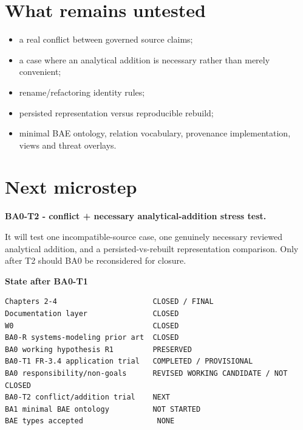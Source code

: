 \documentclass[10pt,a4paper]{article}
\newenvironment{resultbox}[1]{\def\FrameCommand{\fcolorbox{ddtagreen}{ddtagray}}\MakeFramed{\advance\hsize-2\width\FrameRestore}\noindent\textbf{#1}\par\smallskip}{\endMakeFramed}
\begin{document}
\section{What remains untested}
\begin{itemize}
\item a real conflict between governed source claims;
\item a case where an analytical addition is necessary rather than merely convenient;
\item rename/refactoring identity rules;
\item persisted representation versus reproducible rebuild;
\item minimal BAE ontology, relation vocabulary, provenance implementation, views and threat overlays.
\end{itemize}

\section{Next microstep}
\textbf{BA0-T2 - conflict + necessary analytical-addition stress test.}

It will test one incompatible-source case, one genuinely necessary reviewed analytical addition, and a persisted-vs-rebuilt representation comparison. Only after T2 should BA0 be reconsidered for closure.

\enlargethispage{2\baselineskip}
\begin{resultbox}{State after BA0-T1}
\begin{lstlisting}
Chapters 2-4                      CLOSED / FINAL
Documentation layer               CLOSED
W0                                CLOSED
BA0-R systems-modeling prior art  CLOSED
BA0 working hypothesis R1         PRESERVED
BA0-T1 FR-3.4 application trial   COMPLETED / PROVISIONAL
BA0 responsibility/non-goals      REVISED WORKING CANDIDATE / NOT CLOSED
BA0-T2 conflict/addition trial    NEXT
BA1 minimal BAE ontology          NOT STARTED
BAE types accepted                 NONE
\end{lstlisting}
\end{resultbox}
\end{document}
